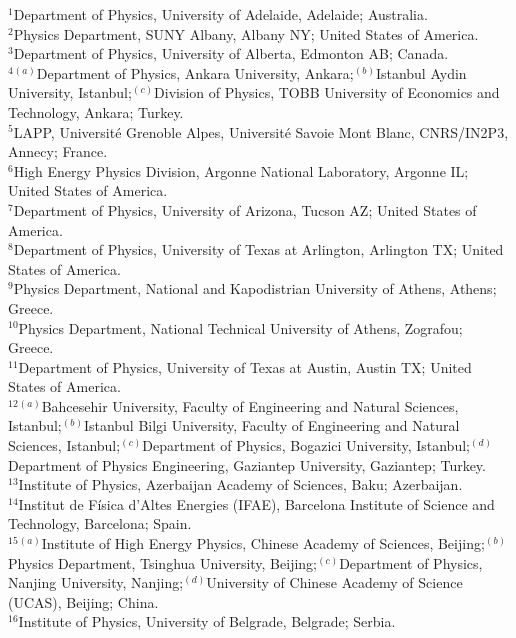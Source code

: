 \begin{flushleft}
$^{1}$Department of Physics, University of Adelaide, Adelaide; Australia.\\
$^{2}$Physics Department, SUNY Albany, Albany NY; United States of America.\\
$^{3}$Department of Physics, University of Alberta, Edmonton AB; Canada.\\
$^{4}$$^{(a)}$Department of Physics, Ankara University, Ankara;$^{(b)}$Istanbul Aydin University, Istanbul;$^{(c)}$Division of Physics, TOBB University of Economics and Technology, Ankara; Turkey.\\
$^{5}$LAPP, Universit\'e Grenoble Alpes, Universit\'e Savoie Mont Blanc, CNRS/IN2P3, Annecy; France.\\
$^{6}$High Energy Physics Division, Argonne National Laboratory, Argonne IL; United States of America.\\
$^{7}$Department of Physics, University of Arizona, Tucson AZ; United States of America.\\
$^{8}$Department of Physics, University of Texas at Arlington, Arlington TX; United States of America.\\
$^{9}$Physics Department, National and Kapodistrian University of Athens, Athens; Greece.\\
$^{10}$Physics Department, National Technical University of Athens, Zografou; Greece.\\
$^{11}$Department of Physics, University of Texas at Austin, Austin TX; United States of America.\\
$^{12}$$^{(a)}$Bahcesehir University, Faculty of Engineering and Natural Sciences, Istanbul;$^{(b)}$Istanbul Bilgi University, Faculty of Engineering and Natural Sciences, Istanbul;$^{(c)}$Department of Physics, Bogazici University, Istanbul;$^{(d)}$Department of Physics Engineering, Gaziantep University, Gaziantep; Turkey.\\
$^{13}$Institute of Physics, Azerbaijan Academy of Sciences, Baku; Azerbaijan.\\
$^{14}$Institut de F\'isica d'Altes Energies (IFAE), Barcelona Institute of Science and Technology, Barcelona; Spain.\\
$^{15}$$^{(a)}$Institute of High Energy Physics, Chinese Academy of Sciences, Beijing;$^{(b)}$Physics Department, Tsinghua University, Beijing;$^{(c)}$Department of Physics, Nanjing University, Nanjing;$^{(d)}$University of Chinese Academy of Science (UCAS), Beijing; China.\\
$^{16}$Institute of Physics, University of Belgrade, Belgrade; Serbia.\\
$$
\end{flushleft}

